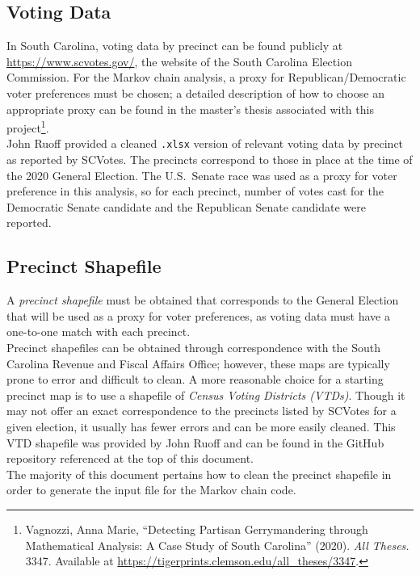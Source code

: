 \documentclass[11pt]{article}
\begin{document}
\subsection{Voting Data}

In South Carolina, voting data by precinct can be found publicly at \url{https://www.scvotes.gov/}, the website of the South Carolina Election Commission. For the Markov chain analysis, a proxy for Republican/Democratic voter preferences must be chosen; a detailed description of how to choose an appropriate proxy can be found in the master's thesis associated with this project\footnote{Vagnozzi, Anna Marie, ``Detecting Partisan Gerrymandering through Mathematical Analysis: A Case Study of South Carolina'' (2020). \textit{All Theses.} 3347. Available at \url{https://tigerprints.clemson.edu/all_theses/3347}.}.\\

John Ruoff provided a cleaned \verb|.xlsx| version of relevant voting data by precinct as reported by SCVotes. The precincts correspond to those in place at the time of the 2020 General Election. The U.S.\ Senate race was used as a proxy for voter preference in this analysis, so for each precinct, number of votes cast for the Democratic Senate candidate and the Republican Senate candidate were reported.

\subsection{Precinct Shapefile}

A \textit{precinct shapefile} must be obtained that corresponds to the General Election that will be used as a proxy for voter preferences, as voting data must have a one-to-one match with each precinct. \\

Precinct shapefiles can be obtained through correspondence with the South Carolina Revenue and Fiscal Affairs Office; however, these maps are typically prone to error and difficult to clean. A more reasonable choice for a starting precinct map is to use a shapefile of \textit{Census Voting Districts (VTDs)}. Though it may not offer an exact correspondence to the precincts listed by SCVotes for a given election, it usually has fewer errors and can be more easily cleaned. This VTD shapefile was provided by John Ruoff and can be found in the GitHub repository referenced at the top of this document. \\

The majority of this document pertains how to clean the precinct shapefile in order to generate the input file for the Markov chain code.
\end{document}
